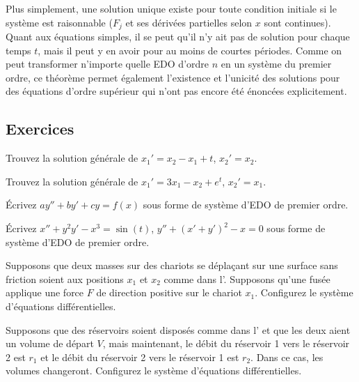 Plus simplement, une solution unique existe pour toute condition initiale si le système est raisonnable ($F_j$ et ses dérivées partielles selon $x$ sont continues). Quant aux équations simples, il se peut qu'il n'y ait pas de solution pour chaque temps $t$, mais il peut y en avoir pour au moins de courtes périodes.
Comme on peut transformer n'importe quelle EDO d'ordre $n$ en un  système du premier ordre, ce théorème permet également l'existence et l'unicité des solutions pour des équations d'ordre supérieur qui n'ont pas encore été énoncées explicitement.

\subsection{Exercices}

\begin{exercise}
Trouvez la solution générale de $x_1' = x_2 - x_1 + t$, $x_2' = x_2$.
\end{exercise}

\begin{exercise}
Trouvez la solution générale de $x_1' = 3 x_1 - x_2 + e^t$, $x_2' = x_1$.
\end{exercise}

\begin{exercise}
Écrivez $ay'' + by' + cy = f(x)$
sous forme de système d'EDO de premier ordre.
\end{exercise}

\begin{exercise}
Écrivez $x'' + y^2 y' - x^3 = \sin(t)$, 
$y'' + {(x'+y')}^2 -x = 0$ sous forme de système d'EDO de premier ordre.
\end{exercise}

\begin{exercise}
Supposons que deux masses sur des chariots se déplaçant sur une surface sans friction soient aux positions $x_1$ et $x_2$ comme dans l'.
Supposons qu'une fusée applique une force $F$ de direction positive sur le chariot
$x_1$. Configurez le système d'équations différentielles.
\end{exercise}

\begin{exercise}
Supposons que des réservoirs soient disposés comme dans l' et que les deux aient un volume de départ $V$,
mais maintenant, le débit du réservoir 1 vers le réservoir 2 est $r_1$ et le débit du réservoir 2 vers le réservoir 1 est $r_2$. Dans ce cas, les volumes changeront. Configurez le système d'équations différentielles.
\end{exercise}


